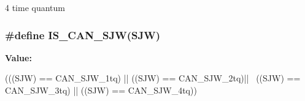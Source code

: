 \label{group__CAN__synchronisation__jump__width_ga7f26a36d478c7ba1a1441b369d62f693}
4 time quantum \hypertarget{group__CAN__synchronisation__jump__width_ga4e4f344712d3bcac1975318d4ab9a383}{
\subsubsection[{IS\_\-CAN\_\-SJW}]{\setlength{\rightskip}{0pt plus 5cm}\#define IS\_\-CAN\_\-SJW(SJW)}}
\label{group__CAN__synchronisation__jump__width_ga4e4f344712d3bcac1975318d4ab9a383}
{\bfseries Value:}
\begin{DoxyCode}
(((SJW) == CAN_SJW_1tq) || ((SJW) == CAN_SJW_2tq)|| \
                         ((SJW) == CAN_SJW_3tq) || ((SJW) == CAN_SJW_4tq))
\end{DoxyCode}

